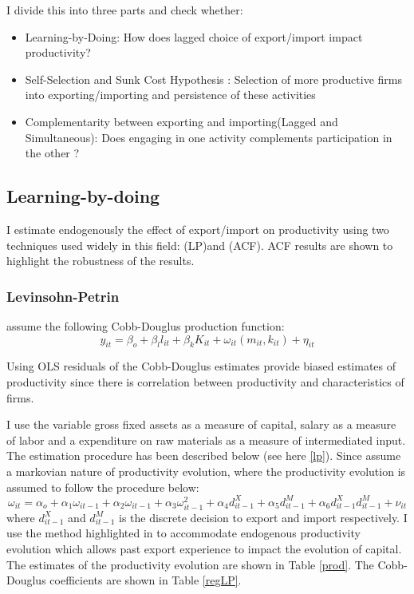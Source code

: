 \documentclass[11pt]{article}
\begin{document}
I divide this into three parts and check whether: 
\begin{itemize}
\item Learning-by-Doing: How does lagged choice of export/import
  impact productivity?
\item Self-Selection and Sunk Cost Hypothesis : Selection of more productive firms into
  exporting/importing and persistence of these activities
\item Complementarity between exporting and importing(Lagged and
  Simultaneous): Does engaging
  in one activity complements participation in the other ?
\end{itemize}
\subsection{Learning-by-doing}
I estimate  endogenously the effect of export/import on productivity
using two techniques  used widely in this field: 
 \cite{levinsohn2003estimating} (LP)and
 \cite{ackerberg2006structural} (ACF).
ACF results are shown to highlight the robustness of the results. 
\subsubsection{Levinsohn-Petrin}
\cite{levinsohn2003estimating} assume the following  Cobb-Douglus production function: 
\begin{equation}
y_{it} = \beta_{o} + \beta_{l}l_{it} + \beta_{k}K_{it} +
\omega_{it}(m_{it}, k_{it}) + \eta_{it} 
\end{equation}

Using OLS residuals of the Cobb-Douglus estimates provide biased
estimates of productivity since there is correlation between
productivity and characteristics  of firms.   

I use the variable gross fixed assets as a measure of capital, salary
as a measure of labor and a expenditure on raw materials as a measure
of intermediated input. The estimation procedure has been described
below (see here \ref{lp}). Since \cite{levinsohn2003estimating} assume
a markovian nature of productivity evolution, where the
productivity evolution is assumed to follow the procedure below:
$$ \omega_{it} = \alpha_{o} + \alpha_{1}\omega_{it-1} +
\alpha_{2}\omega_{it-1} + \alpha_{3}\omega_{it-1}^{2}+
\alpha_{4}d_{it-1}^{X} + \alpha_{5} d_{it-1}^{M} +
\alpha_{6}d_{it-1}^{X}d_{it-1}^{M}  + \nu_{it}
$$ 
where $d_{it-1}^{X}$ and $d_{it-1}^{M}$ is the discrete decision to
export and import respectively. 
 I use the method highlighted in \cite{de2013detecting}  to accommodate endogenous
productivity evolution which allows  past export experience to impact
the evolution of capital. The estimates of the productivity evolution
are shown in Table \ref{prod}. The Cobb-Douglus coefficients are shown in
Table \ref{regLP}. 

 
\end{document}
